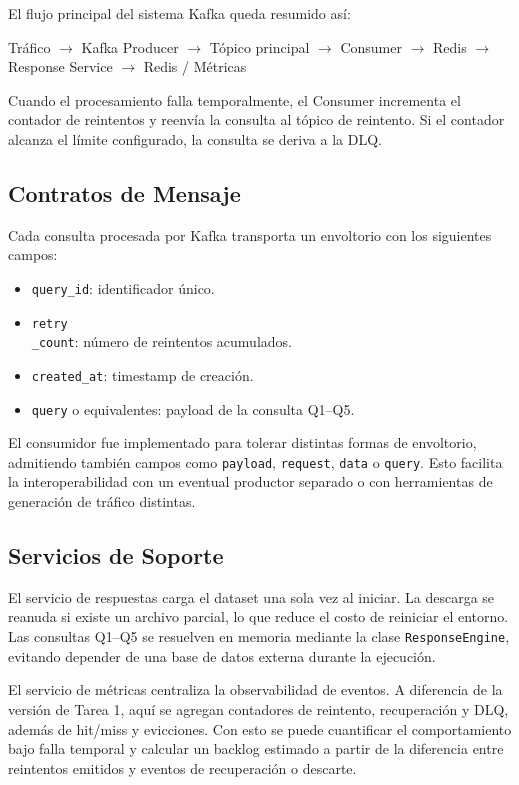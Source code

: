 \documentclass[letter,12pt]{article}
\begin{document}
El flujo principal del sistema Kafka queda resumido as\'i:
\begin{center}
Tr\'afico $\rightarrow$ Kafka Producer $\rightarrow$ T\'opico principal $\rightarrow$ Consumer $\rightarrow$ Redis $\rightarrow$ Response Service $\rightarrow$ Redis / M\'etricas
\end{center}

Cuando el procesamiento falla temporalmente, el Consumer incrementa el contador de reintentos y reenv\'ia la consulta al t\'opico de reintento. Si el contador alcanza el l\'imite configurado, la consulta se deriva a la DLQ.

\subsection{Contratos de Mensaje}
Cada consulta procesada por Kafka transporta un envoltorio con los siguientes campos:
\begin{itemize}
    \item \texttt{query\_id}: identificador \'{u}nico.
    \item \texttt{retry\\_count}: n\'umero de reintentos acumulados.
    \item \texttt{created\_at}: timestamp de creaci\'on.
    \item \texttt{query} o equivalentes: payload de la consulta Q1--Q5.
\end{itemize}

El consumidor fue implementado para tolerar distintas formas de envoltorio, admitiendo tambi\'en campos como \texttt{payload}, \texttt{request}, \texttt{data} o \texttt{query}. Esto facilita la interoperabilidad con un eventual productor separado o con herramientas de generaci\'on de tr\'afico distintas.

\subsection{Servicios de Soporte}
El servicio de respuestas carga el dataset una sola vez al iniciar. La descarga se reanuda si existe un archivo parcial, lo que reduce el costo de reiniciar el entorno. Las consultas Q1--Q5 se resuelven en memoria mediante la clase \texttt{ResponseEngine}, evitando depender de una base de datos externa durante la ejecuci\'on.

El servicio de m\'etricas centraliza la observabilidad de eventos. A diferencia de la versi\'on de Tarea 1, aqu\'i se agregan contadores de reintento, recuperaci\'on y DLQ, adem\'as de hit/miss y evicciones. Con esto se puede cuantificar el comportamiento bajo falla temporal y calcular un backlog estimado a partir de la diferencia entre reintentos emitidos y eventos de recuperaci\'on o descarte.
\end{document}
